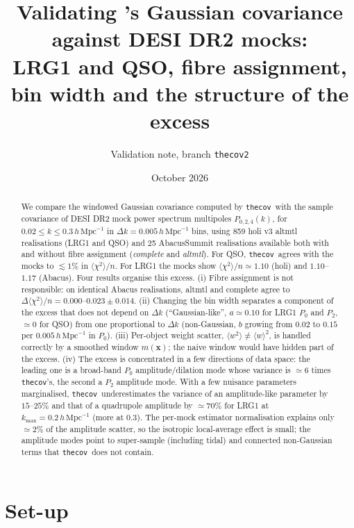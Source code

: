 \documentclass[11pt]{article}
\title{Validating \thecov's Gaussian covariance against DESI DR2 mocks:\\ LRG1 and QSO, fibre assignment, bin width and the structure of the excess}
\author{Validation note, branch \texttt{thecov2}}
\date{October 2026}
\newcommand{\thecov}{\texttt{thecov}}
\newcommand{\hk}{\,h\,\mathrm{Mpc}^{-1}}
\begin{document}
\maketitle

\begin{abstract}
We compare the windowed Gaussian covariance computed by \thecov\ with the sample covariance of DESI DR2 mock power spectrum multipoles $P_{0,2,4}(k)$, for $0.02\le k\le 0.3\hk$ in $\Delta k = 0.005\hk$ bins, using 859 holi v3 altmtl realisations (LRG1 and QSO) and 25 AbacusSummit realisations available both with and without fibre assignment (\emph{complete} and \emph{altmtl}). For QSO, \thecov\ agrees with the mocks to $\lesssim 1\%$ in $\langle\chi^2\rangle/n$. For LRG1 the mocks show $\langle\chi^2\rangle/n \simeq 1.10$ (holi) and $1.10$--$1.17$ (Abacus). Four results organise this excess.
(i) Fibre assignment is not responsible: on identical Abacus realisations, altmtl and complete agree to $\Delta\langle\chi^2\rangle/n = 0.000$--$0.023 \pm 0.014$.
(ii) Changing the bin width separates a component of the excess that does not depend on $\Delta k$ (``Gaussian-like'', $a\simeq 0.10$ for LRG1 $P_0$ and $P_2$, $\simeq0$ for QSO) from one proportional to $\Delta k$ (non-Gaussian, $b$ growing from $0.02$ to $0.15$ per $0.005\hk$ in $P_0$).
(iii) Per-object weight scatter, $\langle w^2\rangle\neq\langle w\rangle^2$, is handled correctly by a smoothed window $m(\mathbf{x})$; the naive window would have hidden part of the excess.
(iv) The excess is concentrated in a few directions of data space: the leading one is a broad-band $P_0$ amplitude/dilation mode whose variance is $\simeq 6$ times \thecov's, the second a $P_2$ amplitude mode. With a few nuisance parameters marginalised, \thecov\ underestimates the variance of an amplitude-like parameter by $15$--$25\%$ and that of a quadrupole amplitude by $\simeq70\%$ for LRG1 at $k_{\max}=0.2\hk$ (more at $0.3$). The per-mock estimator normalisation explains only $\simeq 2\%$ of the amplitude scatter, so the isotropic local-average effect is small; the amplitude modes point to super-sample (including tidal) and connected non-Gaussian terms that \thecov\ does not contain.
\end{abstract}

\tableofcontents

\section{Set-up}
\label{sec:setup}
\end{document}
